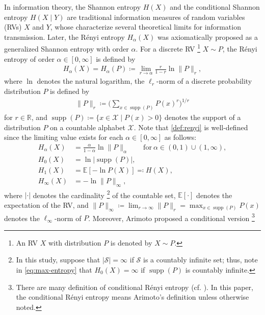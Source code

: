 \documentclass[conference, draftcls, onecolumn]{IEEEtran}
\theoremstyle{plain}
\newcommand{\supp}{\operatorname{supp}}
\begin{document}
In information theory, the Shannon entropy $H(X)$ and the conditional Shannon entropy $H(X \mid Y)$ \cite{shannon} are traditional information measures of random variables (RVs) $X$ and $Y$, whose characterize several theoretical limits for information transmission.
Later, the R\'{e}nyi entropy $H_{\alpha}( X )$ \cite{renyi} was axiomatically proposed as a generalized Shannon entropy with order $\alpha$.
For a discrete RV%
\footnote{An RV $X$ with distribution $P$ is denoted by $X \sim P$.}
$X \sim P$, the R\'{e}nyi entropy of order $\alpha \in [0, \infty]$ is defined by
\begin{align}
H_{\alpha}( X )
=
H_{\alpha}( P )
\coloneqq
\lim_{r \to \alpha} \frac{ r }{ 1 - r } \ln \| P \|_{r} ,
\label{def:renyi}
\end{align}
where $\ln$ denotes the natural logarithm, the $\ell_{r}$-norm of a discrete probability distribution $P$ is defined by
\begin{align}
\| P \|_{r}
\coloneqq
\bigg( \sum_{x \in \supp(P)} P( x )^{r} \bigg)^{1 / r}
\label{def:norm}
\end{align}
for $r \in \mathbb{R}$, and $\supp( P ) \coloneqq \{ x \in \mathcal{X} \mid P( x ) > 0 \}$ denotes the support of a distribution $P$ on a countable alphabet $\mathcal{X}$.
Note that \eqref{def:renyi} is well-defined since the limiting value exists for each $\alpha \in [0, \infty]$ as follows:
\begin{align}
H_{\alpha}( X )
& =
\frac{ \alpha }{ 1 - \alpha } \ln \| P \|_{\alpha}
\qquad \mathrm{for} \ \alpha \in (0, 1) \cup (1, \infty) ,
\\
H_{0}( X )
&
=
\ln | \! \supp( P ) | ,
\label{eq:max-entropy} \\
H_{1}( X )
& =
\mathbb{E}[ - \ln P( X ) ]
\eqqcolon
H( X ) ,
\label{def:shannon} \\
H_{\infty}( X)
& =
- \ln \| P \|_{\infty} ,
\label{def:min_entropy}
\end{align}
where $| \cdot |$ denotes the cardinality%
\footnote{In this study, suppose that $| \mathcal{S} | = \infty$ if $\mathcal{S}$ is a countably infinite set; thus, note in \eqref{eq:max-entropy} that $H_{0}(X) = \infty$ if $\supp( P )$ is countably infinite.}
of the countable set, $\mathbb{E}[ \cdot ]$ denotes the expectation of the RV, and $\| P \|_{\infty} \coloneqq \lim_{r \to \infty} \| P \|_{r} = \max_{x \in \supp(P)} P(x)$ denotes the $\ell_{\infty}$-norm of $P$.
Moreover, Arimoto \cite{arimoto} proposed a conditional version%
\footnote{There are many definition of conditional R\'{e}nyi entropy (cf. \cite{fehr, teixeira, tomamichel}).
In this paper, the conditional R\'{e}nyi entropy means Arimoto's definition unless otherwise noted.}
\end{document}

